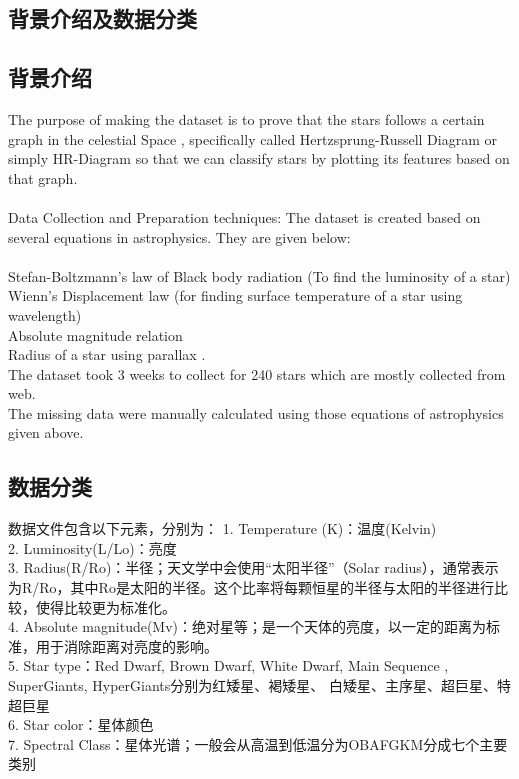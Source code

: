 \documentclass[12pt, a4paper, oneside]{article}
\title{}
\date{\today}
\author{孙陶庵 202011010101}
\begin{document}
\begin{spacing}{2.0}
\tableofcontents
\maketitle


\section{背景介绍及数据分类}
\subsection{背景介绍}
The purpose of making the dataset is to prove that the stars follows a certain graph in the celestial Space ,
specifically called Hertzsprung-Russell Diagram or simply HR-Diagram
so that we can classify stars by plotting its features based on that graph.\\
\\
Data Collection and Preparation techniques:
The dataset is created based on several equations in astrophysics. They are given below:\\
\\
Stefan-Boltzmann's law of Black body radiation (To find the luminosity of a star)\\
Wienn's Displacement law (for finding surface temperature of a star using wavelength)\\
Absolute magnitude relation\\
Radius of a star using parallax .\\
The dataset took 3 weeks to collect for 240 stars which are mostly collected from web.\\
The missing data were manually calculated using those equations of astrophysics given above.\\


\subsection{数据分类}


数据文件包含以下元素，分别为：
1. Temperature (K)：温度(Kelvin)\\
2. Luminosity(L/Lo)：亮度\\
3. Radius(R/Ro)：半径；天文学中会使用“太阳半径”（Solar radius），通常表示为R/Ro，其中Ro是太阳的半径。这个比率将每颗恒星的半径与太阳的半径进行比较，使得比较更为标准化。\\
4. Absolute magnitude(Mv)：绝对星等；是一个天体的亮度，以一定的距离为标准，用于消除距离对亮度的影响。\\
5. Star type：Red Dwarf, Brown Dwarf, White Dwarf, Main Sequence , SuperGiants, HyperGiants分别为红矮星、褐矮星、
白矮星、主序星、超巨星、特超巨星\\
6. Star color：星体颜色\\
7. Spectral Class：星体光谱；一般会从高温到低温分为OBAFGKM分成七个主要类别


\end{spacing}
\end{document}
